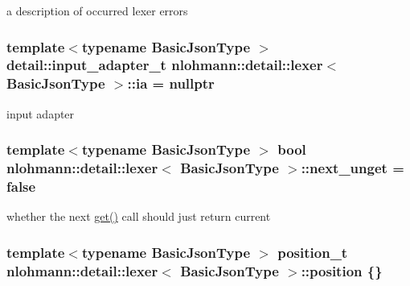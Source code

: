 a description of occurred lexer errors 

\subsubsection[{\texorpdfstring{ia}{ia}}]{\setlength{\rightskip}{0pt plus 5cm}template$<$typename Basic\+Json\+Type $>$ {\bf detail\+::input\+\_\+adapter\+\_\+t} {\bf nlohmann\+::detail\+::lexer}$<$ Basic\+Json\+Type $>$\+::ia = nullptr\hspace{0.3cm}{\ttfamily [private]}}\hypertarget{classnlohmann_1_1detail_1_1lexer_aa7e69cd9d51451fd798eaf501b40421f}{}\label{classnlohmann_1_1detail_1_1lexer_aa7e69cd9d51451fd798eaf501b40421f}


input adapter 

\subsubsection[{\texorpdfstring{next\+\_\+unget}{next_unget}}]{\setlength{\rightskip}{0pt plus 5cm}template$<$typename Basic\+Json\+Type $>$ bool {\bf nlohmann\+::detail\+::lexer}$<$ Basic\+Json\+Type $>$\+::next\+\_\+unget = false\hspace{0.3cm}{\ttfamily [private]}}\hypertarget{classnlohmann_1_1detail_1_1lexer_ae8bedb97b907ba6347c5b2f2666ca01f}{}\label{classnlohmann_1_1detail_1_1lexer_ae8bedb97b907ba6347c5b2f2666ca01f}


whether the next \hyperlink{classnlohmann_1_1detail_1_1lexer_a901e45a34e1fb1d97ab62350b0c3ef26}{get()} call should just return current 

\subsubsection[{\texorpdfstring{position}{position}}]{\setlength{\rightskip}{0pt plus 5cm}template$<$typename Basic\+Json\+Type $>$ {\bf position\+\_\+t} {\bf nlohmann\+::detail\+::lexer}$<$ Basic\+Json\+Type $>$\+::position \{\}\hspace{0.3cm}{\ttfamily [private]}}\hypertarget{classnlohmann_1_1detail_1_1lexer_a932a1b4133619f08fc7442b52368385e}{}\label{classnlohmann_1_1detail_1_1lexer_a932a1b4133619f08fc7442b52368385e}


